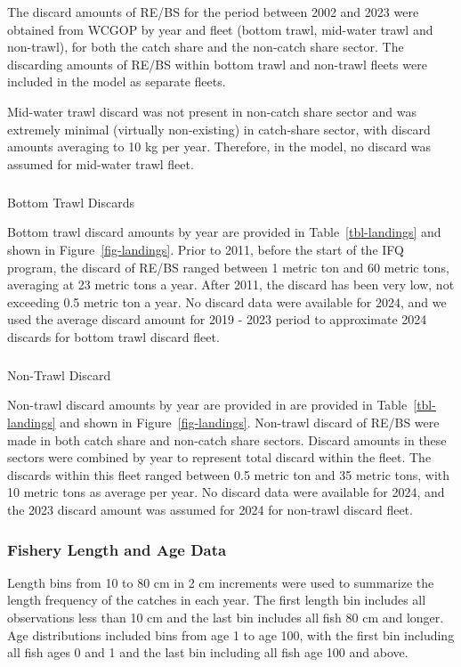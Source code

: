 \documentclass[
]{scrartcl}
\makeatletter
\let\oldsubparagraph\subparagraph
\renewcommand{\subparagraph}{
    \@ifstar
      \xxxSubParagraphStar
      \xxxSubParagraphNoStar
  }
\newcommand{\xxxSubParagraphStar}[1]{\oldsubparagraph*{#1}\mbox{}}
\newcommand{\xxxSubParagraphNoStar}[1]{\oldsubparagraph{#1}\mbox{}}
\makeatother
\begin{document}
The discard amounts of RE/BS for the period between 2002 and 2023 were
obtained from WCGOP by year and fleet (bottom trawl, mid-water trawl and
non-trawl), for both the catch share and the non-catch share sector. The
discarding amounts of RE/BS within bottom trawl and non-trawl fleets
were included in the model as separate fleets.

Mid-water trawl discard was not present in non-catch share sector and
was extremely minimal (virtually non-existing) in catch-share sector,
with discard amounts averaging to 10 kg per year. Therefore, in the
model, no discard was assumed for mid-water trawl fleet.

\subparagraph{Bottom Trawl Discards}\label{bottom-trawl-discards}

Bottom trawl discard amounts by year are provided in
Table~\ref{tbl-landings} and shown in Figure~\ref{fig-landings}. Prior
to 2011, before the start of the IFQ program, the discard of RE/BS
ranged between 1 metric ton and 60 metric tons, averaging at 23 metric
tons a year. After 2011, the discard has been very low, not exceeding
0.5 metric ton a year. No discard data were available for 2024, and we
used the average discard amount for 2019 - 2023 period to approximate
2024 discards for bottom trawl discard fleet.

\subparagraph{Non-Trawl Discard}\label{non-trawl-discard}

Non-trawl discard amounts by year are provided in are provided in
Table~\ref{tbl-landings} and shown in Figure~\ref{fig-landings}.
Non-trawl discard of RE/BS were made in both catch share and non-catch
share sectors. Discard amounts in these sectors were combined by year to
represent total discard within the fleet. The discards within this fleet
ranged between 0.5 metric ton and 35 metric tons, with 10 metric tons as
average per year. No discard data were available for 2024, and the 2023
discard amount was assumed for 2024 for non-trawl discard fleet.

\subsubsection{Fishery Length and Age
Data}\label{fishery-length-and-age-data}

Length bins from 10 to 80 cm in 2 cm increments were used to summarize
the length frequency of the catches in each year. The first length bin
includes all observations less than 10 cm and the last bin includes all
fish 80 cm and longer. Age distributions included bins from age 1 to age
100, with the first bin including all fish ages 0 and 1 and the last bin
including all fish age 100 and above.
\end{document}
